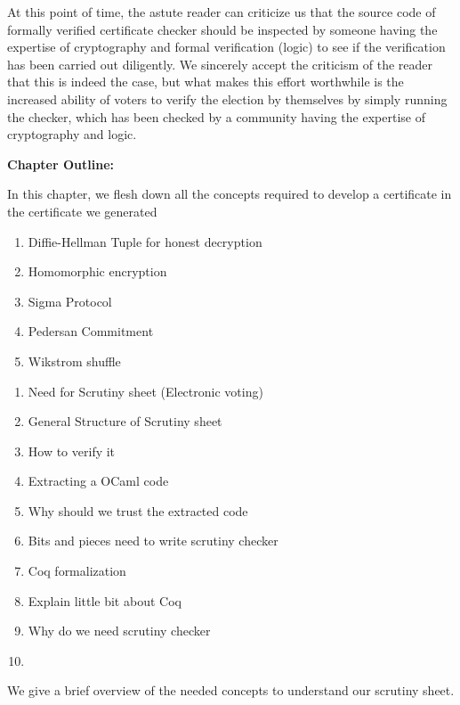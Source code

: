   
  
  At this point of time, the astute reader can criticize us that the source code of formally verified certificate checker should be 
  inspected by someone having the expertise of cryptography and formal verification (logic) 
  to see if the verification has been carried out diligently. We sincerely accept the criticism of the 
  reader that this is indeed the case, but what makes this effort  worthwhile is 
  the increased ability of voters to verify the election by themselves by 
  simply running the checker, which has been checked by a community having the 
  expertise of cryptography and logic. 

\textbf{Chapter Outline:} 


In this chapter, we flesh down all the concepts required to develop a certificate  in the certificate we generated 


\begin{enumerate}
\item Diffie-Hellman Tuple for honest decryption
\item Homomorphic encryption
\item Sigma Protocol
\item Pedersan Commitment 
\item Wikstrom shuffle 
\end{enumerate}


\begin{enumerate}
\item Need for Scrutiny sheet (Electronic voting)
\item General Structure of Scrutiny sheet
\item How to verify it
\item Extracting a OCaml code
\item Why should we trust the extracted code
\item Bits and pieces need to write scrutiny checker
\item Coq formalization
\item Explain little bit about Coq
\item Why do we need scrutiny checker
\item 
\end{enumerate}



We give a brief overview of the needed concepts to understand our scrutiny sheet.



























